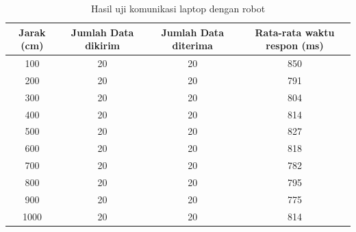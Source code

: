 \begin{table}[H]
  \centering
  \caption{Hasil uji komunikasi laptop dengan robot}
  \label{tab:hasulujipose}
  \begin{tabular}{|c|c|c|c|}
    \hline
    Jarak (cm) & Jumlah Data dikirim & Jumlah Data diterima & Rata-rata waktu respon (ms) \\ \hline
    100        & 20                  & 20                   & 850                         \\ \hline
    200        & 20                  & 20                   & 791                         \\ \hline
    300        & 20                  & 20                   & 804                         \\ \hline
    400        & 20                  & 20                   & 814                         \\ \hline
    500        & 20                  & 20                   & 827                         \\ \hline
    600        & 20                  & 20                   & 818                         \\ \hline
    700        & 20                  & 20                   & 782                         \\ \hline
    800        & 20                  & 20                   & 795                         \\ \hline
    900        & 20                  & 20                   & 775                         \\ \hline
    1000       & 20                  & 20                   & 814                         \\ \hline
    \end{tabular}
\end{table}

